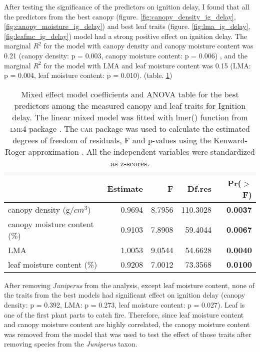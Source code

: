 \documentclass[12pt]{report}
\newcommand{\pkg}[1]{\textsc{#1}}
\begin{document}
After testing the significance of the predictors on ignition delay, I found that all the predictors from the best canopy (figure. \ref{fig:canopy_density_ig_delay}, \ref{fig:canopy_moisture_ig_delay}) and best leaf traits (figure. \ref{fig:lma_ig_delay}, \ref{fig:leafmc_ig_delay}) model had a strong positive effect on ignition delay. The marginal $R^2$ for the model with canopy density and canopy moisture content was 0.21 (canopy density: p = 0.003, canopy moisture content: p = 0.006) , and the marginal $R^2$ for the model with LMA and leaf moisture content was 0.15 (LMA: p = 0.004, leaf moisture content: p = 0.010). (table. \ref{tab:fandpforig_delay})

\begin{table}[ht]
  \centering
  \caption{Mixed effect model coefficients and ANOVA table for the best
    predictors among the measured canopy and leaf traits for Ignition delay.
    The linear mixed model was fitted with lmer() function from \pkg{lme4}
    package \citep{bates2009package}. The \pkg{car} package
    \citep{fox2013hypothesis} was used to calculate the estimated degrees of
    freedom of residuals, F and p-values using the Kenward-Roger approximation
    \citep{kenward1997small}. All the independent variables were standardized
    as z-scores.}
  \begin{tabular}{lrrrr}
    \toprule
    & Estimate & F & Df.res & Pr($>$F) \\ 
    \midrule
    canopy density (g/{$cm^3$}) & 0.9694 & 8.7956  & 110.3028 & \textbf{0.0037} \\ 
    canopy moisture content (\%) & 0.9103 & 7.8908 & 59.4044 & \textbf{0.0067} \\ 
    LMA & 1.0053 & 9.0544  & 54.6628 & \textbf{0.0040} \\  
    leaf moisture content (\%) & 0.9208 & 7.0012  & 73.3568 & \textbf{0.0100} \\ 
    \bottomrule
  \end{tabular}
  \label{tab:fandpforig_delay}
\end{table}

After removing \emph{Juniperus} from the analysis, except leaf moisture content, none of the traits from the best models had significant effect on ignition delay (canopy density: p = 0.392,
LMA: p = 0.273, leaf moisture content: p = 0.027). Leaf is one of the first plant parts to catch fire.
Therefore, since leaf moisture content and canopy moisture content are highly correlated, the canopy moisture content was removed from the model that was used to test the effect of those traits after removing species from the \emph{Juniperus} taxon.
\end{document}
